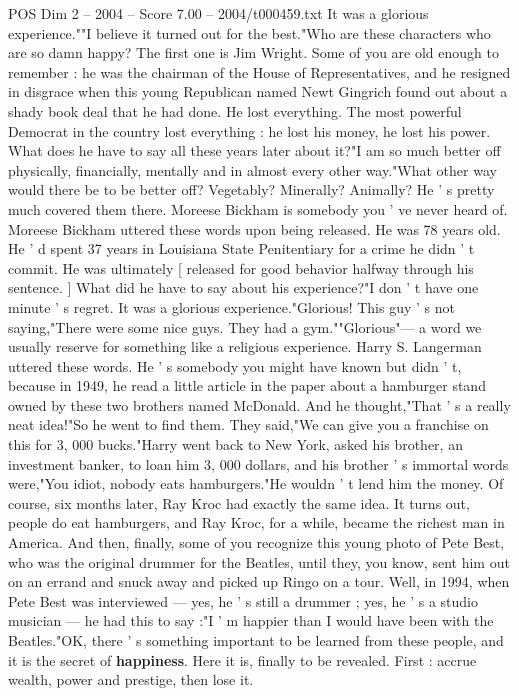 \begin{textsample}{POS Dim 2 – 2004 – Score 7.00 – 2004/t000459.txt}
It was a glorious experience.""I believe it turned out for the best."Who are these characters who are so damn happy?
The first one is Jim Wright.
Some of you are old enough to remember : he was the chairman of the House of Representatives, and he resigned in disgrace when this young Republican named Newt Gingrich found out about a shady book deal that he had done.
He lost everything.
The most powerful Democrat in the country lost everything : he lost his money, he lost his power.
What does he have to say all these years later about it?"I am so much better off physically, financially, mentally and in almost every other way."What other way would there be to be better off?
Vegetably?
Minerally?
Animally?
He ' s pretty much covered them there.
Moreese Bickham is somebody you ' ve never heard of.
Moreese Bickham uttered these words upon being released.
He was 78 years old.
He ' d spent 37 years in Louisiana State Penitentiary for a crime he didn ' t commit.
He was ultimately [ released for good behavior halfway through his sentence. ] What did he have to say about his experience?"I don ' t have one minute ' s regret.
It was a glorious experience."Glorious!
This guy ' s not saying,"There were some nice guys.
They had a gym.""Glorious"— a word we usually reserve for something like a religious experience.
Harry S.
Langerman uttered these words.
He ' s somebody you might have known but didn ' t, because in 1949, he read a little article in the paper about a hamburger stand owned by these two brothers named McDonald.
And he thought,"That ' s a really neat idea!"So he went to find them.
They said,"We can give you a franchise on this for 3, 000 bucks."Harry went back to New York, asked his brother, an investment banker, to loan him 3, 000 dollars, and his brother ' s immortal words were,"You idiot, nobody eats hamburgers."He wouldn ' t lend him the money.
Of course, six months later, Ray Kroc had exactly the same idea.
It turns out, people do eat hamburgers, and Ray Kroc, for a while, became the richest man in America.
And then, finally, some of you recognize this young photo of Pete Best, who was the original drummer for the Beatles, until they, you know, sent him out on an errand and snuck away and picked up Ringo on a tour.
Well, in 1994, when Pete Best was interviewed — yes, he ' s still a drummer ; yes, he ' s a studio musician — he had this to say :"I ' m happier than I would have been with the Beatles."OK, there ' s something important to be learned from these people, and it is the secret of \textbf{happiness}.
Here it is, finally to be revealed.
First : accrue wealth, power and prestige, then lose it.

\end{textsample}
